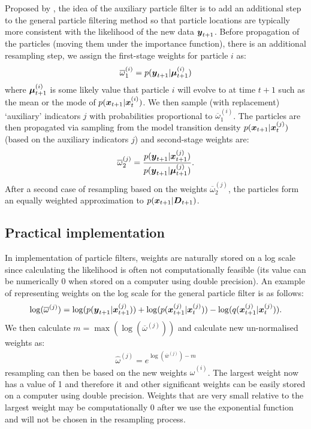 Proposed by \cite{Pitt1999}, the idea of the auxiliary particle filter is to add an additional step to the
general particle filtering method so that particle locations are typically more consistent with the likelihood of the
new data \(\boldsymbol{y}_{t+1}\). Before propagation of the particles (moving them under the importance function), there is an
additional resampling step, we assign the first-stage weights for particle \(i\) as:
\begin{align}
\overline{\omega}^{(i)}_1 = p(\boldsymbol{y}_{t+1} | \boldsymbol{\mu}_{t+1}^{(i)})
\label{eq:auxFilterFirstStage}
\end{align}
where \(\boldsymbol{\mu}_{t+1}^{(i)}\) is some likely value that particle \(i\) will evolve to at time \(t+1\) such as the mean or
the mode of \(p(\boldsymbol{x}_{t+1} | \boldsymbol{x}_t^{(i)})\). We then sample (with replacement) `auxiliary' indicators \(j\)
with probabilities proportional to \(\overline{\omega}^{(i)}_1\). The particles are then propagated via sampling from
the model transition density \(p(\boldsymbol{x}_{t+1} | \boldsymbol{x}_t^{(j)})\) (based on the auxiliary indicators \(j\)) and
second-stage weights are:
\begin{align}
\overline{\omega}^{(j)}_2 = \frac{p(\boldsymbol{y}_{t+1} | \boldsymbol{x}_{t+1}^{(j)})}{p(\boldsymbol{y}_{t+1} |
\boldsymbol{\mu}_{t+1}^{(j)})}.
\label{eq:auxFilterSecondStage}
\end{align}
After a second case of resampling based on the weights \(\overline{\omega}^{(j)}_2\), the particles form an
equally weighted approximation to \(p(\boldsymbol{x}_{t+1} | \boldsymbol{D}_{t+1})\).

\subsection{Practical implementation}

In implementation of particle filters, weights are naturally stored on a log scale since calculating the likelihood is
often not computationally feasible (its value can be numerically 0 when stored on a computer using double
precision). An example of representing weights on the log scale for the general particle filter is as follows:
\begin{align}
\log(\overline{\omega}^{(j)}) = \log(p(\boldsymbol{y}_{t+1} | \boldsymbol{x}_{t+1}^{(j)})) + \log(p(\boldsymbol{x}_{t+1}^{(j)} |
\boldsymbol{x}_t^{(j)})) - \log(q(\boldsymbol{x}_{t+1}^{(j)} | \boldsymbol{x}_t^{(j)})).
\end{align}
We then calculate \(m = \max(\log(\overline{\omega}^{(j)}))\) and calculate new un-normalised weights as:
\begin{align}
\hat{\omega}^{(j)} = e^{\log(\overline{w}^{(j)}) - m}
\end{align}
resampling can then be based on the new weights \(\hat{\omega}^{(i)}\). The largest weight now has a value of 1 and therefore
it and other significant weights can be easily stored on a computer using double precision. Weights that are very small
relative to the largest weight may be computationally 0 after we use the exponential function and will not be chosen in
the resampling process.


